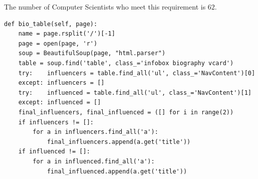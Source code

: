 \documentclass[12pt, twoside]{article}
\begin{document}
The number of Computer Scientists who meet this requirement is $ 62 $.
\begin{lstlisting}[language = iPython, caption={Checking Bio Table Function},captionpos=b]
def bio_table(self, page):
    name = page.rsplit('/')[-1]
    page = open(page, 'r')
    soup = BeautifulSoup(page, "html.parser")
    table = soup.find('table', class_='infobox biography vcard')
    try:	influencers = table.find_all('ul', class_='NavContent')[0]
    except:	influencers = []
    try:	influenced = table.find_all('ul', class_='NavContent')[1]
    except:	influenced = []
    final_influencers, final_influenced = ([] for i in range(2))
    if influencers != []:
        for a in influencers.find_all('a'):
        	final_influencers.append(a.get('title'))
    if influenced != []:
        for a in influenced.find_all('a'):
        	final_influenced.append(a.get('title'))
\end{lstlisting}

\newpage
\end{document}
